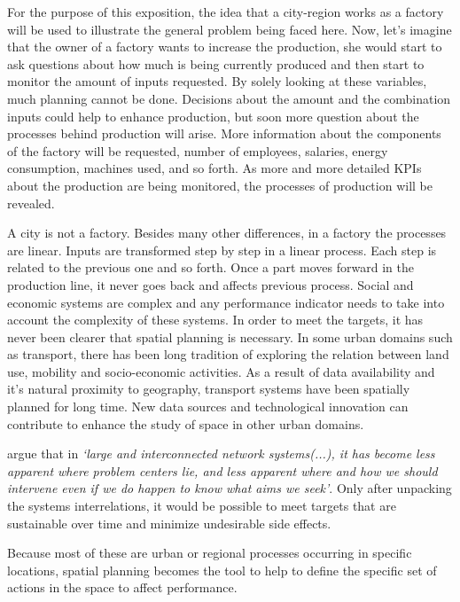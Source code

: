 For the purpose of this exposition, the idea that a city-region works as a factory will be used to illustrate the general problem being faced here. Now, let's imagine that the owner of a factory wants to increase the production, she would start to ask questions about how much is being currently produced and then start to monitor the amount of inputs requested. By solely looking at these variables, much planning cannot be done. Decisions about the amount and the combination inputs could help to enhance production, but soon more question about the processes behind production will arise. More information about the components of the factory will be requested, number of employees, salaries, energy consumption, machines used, and so forth. As more and more detailed KPIs about the production are being monitored, the processes of production will be revealed. \par

A city is not a factory. Besides many other differences, in a factory the processes are linear. Inputs are transformed step by step in a linear process. Each step is related to the previous one and so forth. Once a part moves forward in the production line, it never goes back and affects previous process. Social and economic systems are complex and any performance indicator needs to take into account the complexity of these systems. 
In order to meet the targets, it has never been clearer that spatial planning is necessary. In some urban domains such as transport, there has been long tradition of exploring the relation between land use, mobility and socio-economic activities. As a result of data availability and it's natural proximity to geography, transport systems have been spatially planned for long time. New data sources and technological innovation can contribute to enhance the study of space in other urban domains. \par

\textcite{Rittel1973} argue that in \textit{`large and interconnected network systems(...), it has become less apparent where problem centers lie, and less apparent where and how we should intervene even if we do happen to know what aims we seek'}. Only after unpacking the systems interrelations, it would be possible to meet targets that are sustainable over time and minimize undesirable side effects.\par

Because most of these are urban or regional processes occurring in specific locations, spatial planning becomes the tool to help to define the specific set of actions in the space to affect performance.  \par


